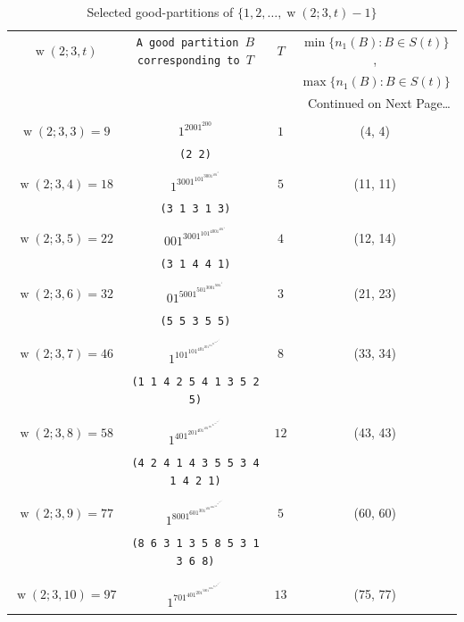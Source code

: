 \documentclass[final,3p,times]{elsarticle}
\theoremstyle{definition}
\newcommand{\set}[1]{\{#1\}}
\DeclareMathOperator{\vdw}{w}
\begin{document}
{\scriptsize
\begin{longtable}[c]{|c|c|c|c|}
\caption{ Selected good-partitions of $\set{1,2,\ldots,\vdw(2; 3, t)-1}$}
\label{tab-ones}\\
  \hline \hline
 {\tt $\vdw(2; 3, t)$} & {\tt A good partition $B$ corresponding to $T$} &{\tt $T$} & {$\min\set{n_1(B): B\in S(t)}$,}\\
 {} & {} &{} & {$\max\set{n_1(B): B\in S(t)}$}\\
  \hline
\endhead
\hline
  \multicolumn{4}{|r|}{{Continued on Next Page\ldots}} \\
\hline
\endfoot
\endlastfoot
{} & {\tt } & {} & {}\\
{$\vdw(2; 3, 3) = 9$} & {$1^2001^200$} & {$1$}& {(4, 4)}\\
{} & {\tt (2 2)} & {}& {}\\
{} & {\tt } & {}& {}\\
{$\vdw(2; 3, 4) = 18$} & {$1^3001^101^3001^101^3$} & {$5$}& {(11, 11)}\\
{} & {\tt (3 1 3 1 3)} & {}& {}\\
{} & {\tt } & {}& {}\\
{$\vdw(2; 3, 5) = 22$} & {$001^3001^101^4001^401^1$} & {$4$}& {(12, 14)}\\
{} & {\tt (3 1 4 4 1)} & {}& {}\\
{} & {\tt } & {}& {}\\
{$\vdw(2; 3, 6) = 32$} & {$01^5001^501^3001^5001^5$} & {$3$}& {(21, 23)}\\
{} & {\tt (5 5 3 5 5)} & {}& {}\\
{} & {\tt } & {}& {}\\
{$\vdw(2; 3, 7) = 46$} & {$1^101^101^401^201^501^401^1001^301^501^201^50$} & {$8$}& {(33, 34)}\\
{} & {\tt (1 1 4 2 5 4 1 3 5 2 5)} & {}& {}\\
{} & {\tt } & {}& {}\\
{$\vdw(2; 3, 8) = 58$} & {$1^401^201^401^101^401^301^5001^501^301^401^101^401^201^1$} & {$12$}& {(43, 43)}\\
{} & {\tt (4 2 4 1 4 3 5 5 3 4 1 4 2 1)} & {}& {}\\
{} & {\tt } & {}& {}\\
{$\vdw(2; 3, 9) = 77$} & {$1^8001^601^301^101^3001^501^801^5001^301^101^301^6001^8$} & {$5$}& {(60, 60)}\\
{} & {\tt (8 6 3 1 3 5 8 5 3 1 3 6 8)} & {}& {}\\
{} & {\tt } & {}& {}\\
{$\vdw(2; 3, 10) = 97$} & {$1^701^401^201^5001^2001^701^401^801^101^801^4001^6001^2001^801^9$} & {$13$}& {(75, 77)}\\

\end{longtable}}
\end{document}
